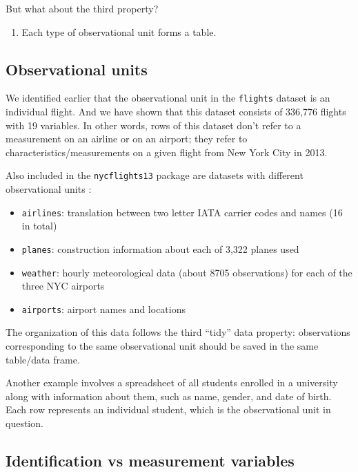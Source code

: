 \documentclass[12pt,]{krantz}
\providecommand{\tightlist}{%
  \setlength{\itemsep}{0pt}\setlength{\parskip}{0pt}}
\renewenvironment{quote}{\begin{VF}}{\end{VF}}
\theoremstyle{definition}
\theoremstyle{definition}
\theoremstyle{definition}
\theoremstyle{remark}
\begin{document}
But what about the third property?

\begin{quote}
\begin{enumerate}
\def\labelenumi{\arabic{enumi}.}
\setcounter{enumi}{2}
\tightlist
\item
  Each type of observational unit forms a table.
\end{enumerate}
\end{quote}

\subsection{Observational units}\label{observational-units}

We identified earlier that the observational unit in the
\texttt{flights} dataset is an individual flight. And we have shown that
this dataset consists of 336,776 flights with 19 variables. In other
words, rows of this dataset don't refer to a measurement on an airline
or on an airport; they refer to characteristics/measurements on a given
flight from New York City in 2013.

Also included in the \texttt{nycflights13} package are datasets with
different observational units \citep{R-nycflights13}:

\begin{itemize}
\tightlist
\item
  \texttt{airlines}: translation between two letter IATA carrier codes
  and names (16 in total)
\item
  \texttt{planes}: construction information about each of 3,322 planes
  used
\item
  \texttt{weather}: hourly meteorological data (about 8705 observations)
  for each of the three NYC airports
\item
  \texttt{airports}: airport names and locations
\end{itemize}

The organization of this data follows the third ``tidy'' data property:
observations corresponding to the same observational unit should be
saved in the same table/data frame.

Another example involves a spreadsheet of all students enrolled in a
university along with information about them, such as name, gender, and
date of birth. Each row represents an individual student, which is the
observational unit in question.

\subsection{Identification vs measurement
variables}\label{identification-vs-measurement}
\end{document}
